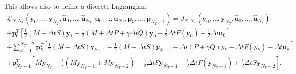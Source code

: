 This allows also to define a discrete Lagrangian:
\begin{multline}
\mathcal{L}_{N,N_{T}}(\mathbf{y}_{0}, \ldots, \mathbf{y}_{N_{T}}, \mathbf{\hat u}_{0}, \ldots, \mathbf{\hat u}_{N_{T}}, \mathbf{u}_{0}, \ldots, \mathbf{ u}_{N_{T}}, \mathbf{p}_{0}, \ldots, \mathbf{p}_{N_{T}-1}) = J_{N,N_{T}}(\mathbf{y}_{0}, \ldots, \mathbf{y}_{N_{T}}, \mathbf{\hat u}_{0}, \ldots, \mathbf{\hat u}_{N_{T}})  \\
 + \mathbf{p}_0^T\left[ \frac{1}{2}\left( M+\Delta t S\right) \mathbf{y}_1 - \frac{1}{2}\left( M + \Delta t P + \gamma \Delta t Q \right) \mathbf{y}_0 - \frac{1}{2}\Delta t F(\mathbf{y}_0) - \frac{1}{2}\Delta t \mathbf{u}_0 \right]\\
 +\sum_{k=1}^{N_T-2}{\mathbf{p}_k^T\left[
 \frac{1}{2}\left( M+\Delta t S\right) \mathbf{y}_{k+1} - \frac{1}{2}\left( M - \Delta t S\right) \mathbf{y}_{k-1} - \Delta t \left( P + \gamma Q\right)y_k - \Delta t F(y_k) - \Delta t \mathbf{u}_k\right]}\\
 + \mathbf{p}_{N_T-1}^T\left[ M \mathbf{y}_{N_T} - \frac{1}{2}\left( M \mathbf{y}_{N_T-1} + M \mathbf{y}_{N_T-2} \right)- \frac{1}{2}\Delta t P \mathbf{y}_{N_T - 1} - \frac{1}{2}\Delta t F(\mathbf{y}_{N_T-1}) +\frac{1}{2}\Delta t S \mathbf{y}_{N_T-2}\right].
 \label{discrlag}
 \end{multline}

